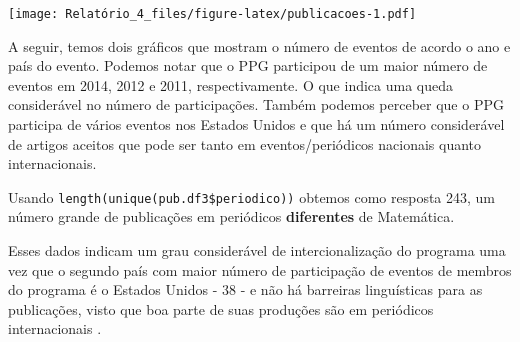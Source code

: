 \documentclass[]{article}
\newenvironment{Shaded}{\begin{snugshade}}{\end{snugshade}}
\newcommand{\KeywordTok}[1]{\textcolor[rgb]{0.13,0.29,0.53}{\textbf{#1}}}
\newcommand{\DataTypeTok}[1]{\textcolor[rgb]{0.13,0.29,0.53}{#1}}
\newcommand{\DecValTok}[1]{\textcolor[rgb]{0.00,0.00,0.81}{#1}}
\newcommand{\StringTok}[1]{\textcolor[rgb]{0.31,0.60,0.02}{#1}}
\newcommand{\ControlFlowTok}[1]{\textcolor[rgb]{0.13,0.29,0.53}{\textbf{#1}}}
\newcommand{\OperatorTok}[1]{\textcolor[rgb]{0.81,0.36,0.00}{\textbf{#1}}}
\newcommand{\NormalTok}[1]{#1}
\begin{document}
\texttt{[image: Relatório\_4\_files/figure-latex/publicacoes-1.pdf]}

A seguir, temos dois gráficos que mostram o número de eventos de acordo
o ano e país do evento. Podemos notar que o PPG participou de um maior
número de eventos em 2014, 2012 e 2011, respectivamente. O que indica
uma queda considerável no número de participações. Também podemos
perceber que o PPG participa de vários eventos nos Estados Unidos e que
há um número considerável de artigos aceitos que pode ser tanto em
eventos/periódicos nacionais quanto internacionais.

Usando \texttt{length(unique(pub.df3\$periodico))} obtemos como resposta
243, um número grande de publicações em periódicos \textbf{diferentes}
de Matemática.

Esses dados indicam um grau considerável de intercionalização do
programa uma vez que o segundo país com maior número de participação de
eventos de membros do programa é o Estados Unidos - 38 - e não há
barreiras linguísticas para as publicações, visto que boa parte de suas
produções são em periódicos internacionais .

\begin{Shaded}
\end{Shaded}
\end{document}
